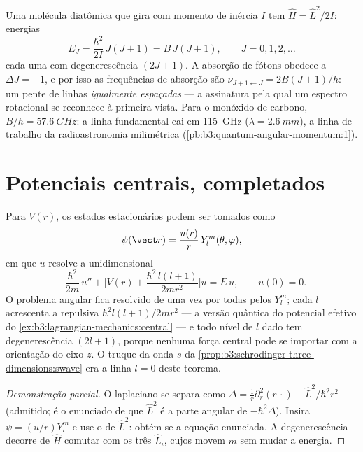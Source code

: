 \begin{example}\label{ex:b3:quantum-angular-momentum:rotor}
Uma molécula diatômica que gira com momento de inércia $I$ tem $\hat H
= \hat L^2/2I$: energias
\[
E_J = \frac{\hbar^2}{2I}\,J(J+1) = B\,J(J+1) ,
\qquad J = 0, 1, 2, \dots
\]
cada uma com degenerescência $(2J+1)$. A absorção de fótons obedece a $\Delta J =
\pm1$, e por isso as frequências de absorção são $\nu_{J+1\leftarrow J} =
2B(J+1)/h$: um pente de linhas
\emph{igualmente espaçadas} --- a assinatura pela qual um espectro
rotacional se reconhece à primeira vista. Para o monóxido de carbono,
$B/h = \qty{57.6}{GHz}$: a linha fundamental cai em \qty{115}{GHz}
($\lambda = \qty{2.6}{mm}$), a linha de trabalho da radioastronomia
milimétrica (\cref{pb:b3:quantum-angular-momentum:1}).
\end{example}

\section{Potenciais centrais, completados}

\begin{theorem}\label{thm:b3:quantum-angular-momentum:radial}
Para $V(r)$, os estados estacionários podem ser tomados como
\[
\psi(\vect r) = \frac{u(r)}{r}\,Y_l^m(\theta, \varphi) ,
\]
em que $u$ resolve a  unidimensional
\[
-\frac{\hbar^2}{2m}\,u'' + \Big[V(r) +
\frac{\hbar^2\,l(l+1)}{2mr^2}\Big]u = E\,u , \qquad u(0) = 0 .
\]
O problema angular fica resolvido de uma vez por todas pelos $Y_l^m$;
cada $l$ acrescenta a \emph{} repulsiva
$\hbar^2l(l+1)/2mr^2$ --- a versão quântica do potencial efetivo do
\cref{ex:b3:lagrangian-mechanics:central} --- e todo nível de $l$ dado
tem degenerescência $(2l+1)$, porque nenhuma força central pode se
importar com a orientação do eixo $z$. O truque da onda $s$ da
\cref{prop:b3:schrodinger-three-dimensions:swave} era a linha $l = 0$
deste teorema.
\end{theorem}

\begin{proof}[Demonstração parcial]
O laplaciano se separa como $\Delta = \tfrac1r\partial_r^2(r\,\cdot) -
\hat L^2/\hbar^2r^2$ (admitido; é o enunciado de que $\hat L^2$ é a
parte angular de $-\hbar^2\Delta$). Insira $\psi = (u/r)Y_l^m$ e use o
 de $\hat L^2$: obtém-se a equação enunciada. A
degenerescência decorre de $\hat H$ comutar com os três $\hat
L_i$, cujos  movem $m$ sem mudar a energia.
\end{proof}

